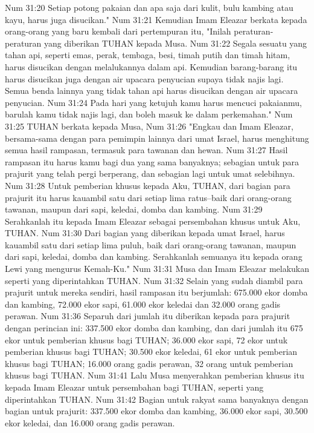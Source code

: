 Num 31:20  Setiap potong pakaian dan apa saja dari kulit, bulu kambing atau kayu, harus juga disucikan."
Num 31:21  Kemudian Imam Eleazar berkata kepada orang-orang yang baru kembali dari pertempuran itu, "Inilah peraturan-peraturan yang diberikan TUHAN kepada Musa.
Num 31:22  Segala sesuatu yang tahan api, seperti emas, perak, tembaga, besi, timah putih dan timah hitam, harus disucikan dengan melalukannya dalam api. Kemudian barang-barang itu harus disucikan juga dengan air upacara penyucian supaya tidak najis lagi. Semua benda lainnya yang tidak tahan api harus disucikan dengan air upacara penyucian.
Num 31:24  Pada hari yang ketujuh kamu harus mencuci pakaianmu, barulah kamu tidak najis lagi, dan boleh masuk ke dalam perkemahan."
Num 31:25  TUHAN berkata kepada Musa,
Num 31:26  "Engkau dan Imam Eleazar, bersama-sama dengan para pemimpin lainnya dari umat Israel, harus menghitung semua hasil rampasan, termasuk para tawanan dan hewan.
Num 31:27  Hasil rampasan itu harus kamu bagi dua yang sama banyaknya; sebagian untuk para prajurit yang telah pergi berperang, dan sebagian lagi untuk umat selebihnya.
Num 31:28  Untuk pemberian khusus kepada Aku, TUHAN, dari bagian para prajurit itu harus kauambil satu dari setiap lima ratus--baik dari orang-orang tawanan, maupun dari sapi, keledai, domba dan kambing.
Num 31:29  Serahkanlah itu kepada Imam Eleazar sebagai persembahan khusus untuk Aku, TUHAN.
Num 31:30  Dari bagian yang diberikan kepada umat Israel, harus kauambil satu dari setiap lima puluh, baik dari orang-orang tawanan, maupun dari sapi, keledai, domba dan kambing. Serahkanlah semuanya itu kepada orang Lewi yang mengurus Kemah-Ku."
Num 31:31  Musa dan Imam Eleazar melakukan seperti yang diperintahkan TUHAN.
Num 31:32  Selain yang sudah diambil para prajurit untuk mereka sendiri, hasil rampasan itu berjumlah: 675.000 ekor domba dan kambing, 72.000 ekor sapi, 61.000 ekor keledai dan 32.000 orang gadis perawan.
Num 31:36  Separuh dari jumlah itu diberikan kepada para prajurit dengan perincian ini: 337.500 ekor domba dan kambing, dan dari jumlah itu 675 ekor untuk pemberian khusus bagi TUHAN; 36.000 ekor sapi, 72 ekor untuk pemberian khusus bagi TUHAN; 30.500 ekor keledai, 61 ekor untuk pemberian khusus bagi TUHAN; 16.000 orang gadis perawan, 32 orang untuk pemberian khusus bagi TUHAN.
Num 31:41  Lalu Musa menyerahkan pemberian khusus itu kepada Imam Eleazar untuk persembahan bagi TUHAN, seperti yang diperintahkan TUHAN.
Num 31:42  Bagian untuk rakyat sama banyaknya dengan bagian untuk prajurit: 337.500 ekor domba dan kambing, 36.000 ekor sapi, 30.500 ekor keledai, dan 16.000 orang gadis perawan.
